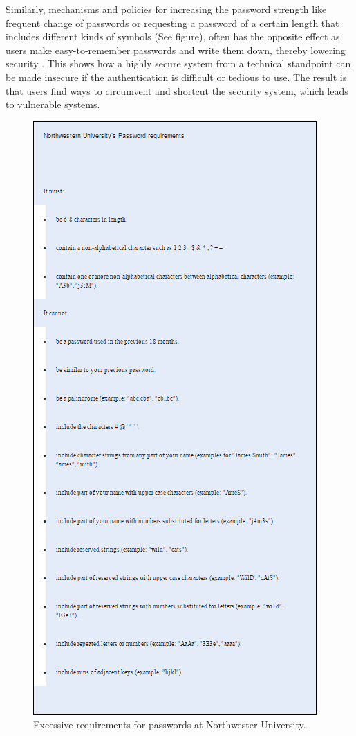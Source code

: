 \documentclass{article}
\begin{document}
Similarly, mechanisms and policies for increasing the password strength like frequent change of passwords or requesting a password of a certain length that includes different kinds of symbols (See figure), often has the opposite effect as users make easy-to-remember passwords and write them down, thereby lowering security \cite{adams1999users}. This shows how a highly secure system from a technical standpoint can be made insecure if the authentication is difficult or tedious to use. The result is that users find ways to circumvent and shortcut the security system, which leads to vulnerable systems. 

\begin{figure}
  \centering
    \includegraphics[scale=0.8]{northwestern_password_requirements}
     \caption{Excessive requirements for passwords at Northwester University.}
\end{figure}
\end{document}
